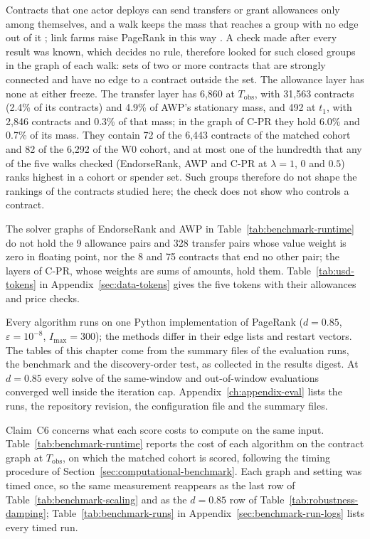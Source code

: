 Contracts that one actor deploys can send transfers or grant allowances only among themselves, and a walk keeps the mass that reaches a group with no edge out of it \parencite{langville2006pagerank}; link farms raise PageRank in this way \parencite{gyongyi2005alliances}. A check made after every result was known, which decides no rule, therefore looked for such closed groups in the graph of each walk: sets of two or more contracts that are strongly connected and have no edge to a contract outside the set. The allowance layer has none at either freeze. The transfer layer has 6,860 at $T_{\mathrm{obs}}$, with 31,563 contracts (2.4\% of its contracts) and 4.9\% of AWP's stationary mass, and 492 at $t_1$, with 2,846 contracts and 0.3\% of that mass; in the graph of \mbox{C-PR} they hold 6.0\% and 0.7\% of its mass. They contain 72 of the 6,443 contracts of the matched cohort and 82 of the 6,292 of the W0 cohort, and at most one of the hundredth that any of the five walks checked (EndorseRank, AWP and \mbox{C-PR} at $\lambda=1$, $0$ and $0.5$) ranks highest in a cohort or spender set. Such groups therefore do not shape the rankings of the contracts studied here; the check does not show who controls a contract.

The solver graphs of EndorseRank and AWP in Table~\ref{tab:benchmark-runtime} do not hold the 9 allowance pairs and 328 transfer pairs whose value weight is zero in floating point, nor the 8 and 75 contracts that end no other pair; the layers of \mbox{C-PR}, whose weights are sums of amounts, hold them. Table~\ref{tab:usd-tokens} in Appendix~\ref{sec:data-tokens} gives the five tokens with their allowances and price checks.


Every algorithm runs on one Python implementation of PageRank ($d=0.85$, $\varepsilon=10^{-8}$, $I_{\max}=300$); the methods differ in their edge lists and restart vectors. The tables of this chapter come from the summary files of the evaluation runs, the benchmark and the discovery-order test, as collected in the results digest. At $d=0.85$ every solve of the same-window and out-of-window evaluations converged well inside the iteration cap. Appendix~\ref{ch:appendix-eval} lists the runs, the repository revision, the configuration file and the summary files.


Claim~C6 concerns what each score costs to compute on the same input. Table~\ref{tab:benchmark-runtime} reports the cost of each algorithm on the contract graph at $T_{\mathrm{obs}}$, on which the matched cohort is scored, following the timing procedure of Section~\ref{sec:computational-benchmark}. Each graph and setting was timed once, so the same measurement reappears as the last row of Table~\ref{tab:benchmark-scaling} and as the $d=0.85$ row of Table~\ref{tab:robustness-damping}; Table~\ref{tab:benchmark-runs} in Appendix~\ref{sec:benchmark-run-logs} lists every timed run.

